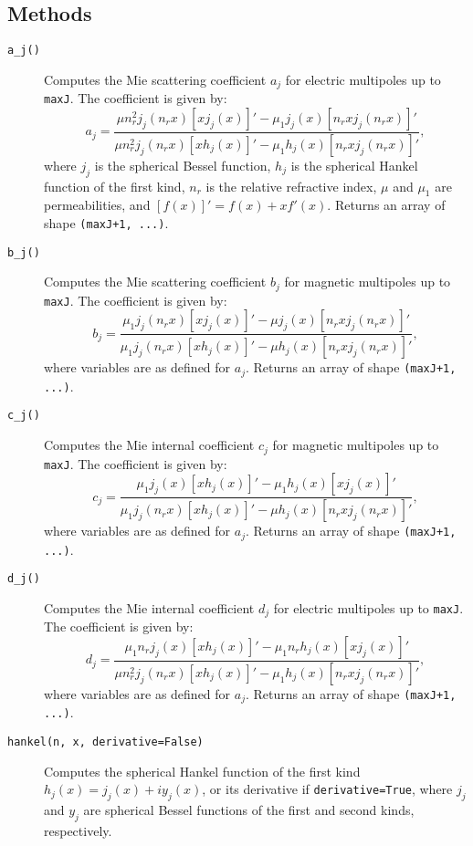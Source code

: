 \subsection{Methods}
\begin{description}
    \item[\texttt{a\_j()}]
    Computes the Mie scattering coefficient \( a_j \) for electric multipoles up to \texttt{maxJ}. The coefficient is given by:
    \begin{equation}
        a_j = \frac{\mu n_r^2 j_j(n_r x) [x j_j(x)]' - \mu_1 j_j(x) [n_r x j_j(n_r x)]'}{\mu n_r^2 j_j(n_r x) [x h_j(x)]' - \mu_1 h_j(x) [n_r x j_j(n_r x)]'},
    \end{equation}
    where \( j_j \) is the spherical Bessel function, \( h_j \) is the spherical Hankel function of the first kind, \( n_r \) is the relative refractive index, \( \mu \) and \( \mu_1 \) are permeabilities, and \( [f(x)]' = f(x) + x f'(x) \). Returns an array of shape \texttt{(maxJ+1, ...)}.

    \item[\texttt{b\_j()}]
    Computes the Mie scattering coefficient \( b_j \) for magnetic multipoles up to \texttt{maxJ}. The coefficient is given by:
    \begin{equation}
        b_j = \frac{\mu_1 j_j(n_r x) [x j_j(x)]' - \mu j_j(x) [n_r x j_j(n_r x)]'}{\mu_1 j_j(n_r x) [x h_j(x)]' - \mu h_j(x) [n_r x j_j(n_r x)]'},
    \end{equation}
    where variables are as defined for \( a_j \). Returns an array of shape \texttt{(maxJ+1, ...)}.

    \item[\texttt{c\_j()}]
    Computes the Mie internal coefficient \( c_j \) for magnetic multipoles up to \texttt{maxJ}. The coefficient is given by:
    \begin{equation}
        c_j = \frac{\mu_1 j_j(x) [x h_j(x)]' - \mu_1 h_j(x) [x j_j(x)]'}{\mu_1 j_j(n_r x) [x h_j(x)]' - \mu h_j(x) [n_r x j_j(n_r x)]'},
    \end{equation}
    where variables are as defined for \( a_j \). Returns an array of shape \texttt{(maxJ+1, ...)}.

    \item[\texttt{d\_j()}]
    Computes the Mie internal coefficient \( d_j \) for electric multipoles up to \texttt{maxJ}. The coefficient is given by:
    \begin{equation}
        d_j = \frac{\mu_1 n_r j_j(x) [x h_j(x)]' - \mu_1 n_r h_j(x) [x j_j(x)]'}{\mu n_r^2 j_j(n_r x) [x h_j(x)]' - \mu_1 h_j(x) [n_r x j_j(n_r x)]'},
    \end{equation}
    where variables are as defined for \( a_j \). Returns an array of shape \texttt{(maxJ+1, ...)}.

    \item[\texttt{hankel(n, x, derivative=False)}]
    Computes the spherical Hankel function of the first kind \( h_j(x) = j_j(x) + i y_j(x) \), or its derivative if \texttt{derivative=True}, where \( j_j \) and \( y_j \) are spherical Bessel functions of the first and second kinds, respectively.
\end{description}


